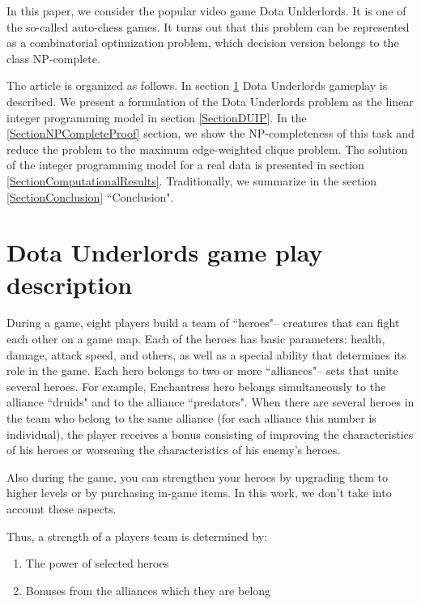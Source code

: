 \documentclass[smallextended]{svjour3}       %
\begin{document}
In this paper, we consider the popular video game Dota Unlderlords. It is one of the so-called auto-chess games. It turns out that this problem can be represented as a combinatorial optimization problem, which decision version  belongs to the class NP-complete.

The article is organized as follows. In section \ref{SectionDUDescription} Dota Underlords gameplay is described.
We present a formulation of the Dota Underlords problem as the linear integer programming model in section \ref{SectionDUIP}. In the \ref{SectionNPCompleteProof} section, we show the NP-completeness of this task and reduce the problem to the maximum edge-weighted clique problem. The solution of the integer programming model for a real data is presented in section \ref{SectionComputationalResults}. Traditionally, we summarize in the section \ref{SectionConclusion} ``Conclusion".

\section{Dota Underlords game play description}
\label{SectionDUDescription}

During a game, eight players build a team of ``heroes"-- creatures that can fight each other on a game map. Each of the heroes has basic parameters: health, damage, attack speed, and others, as well as a special ability that determines its role in the game. Each hero belongs to two or more ``alliances"-- sets that unite several heroes. For example, Enchantress hero belongs simultaneously to the alliance ``druids" and to the alliance ``predators". When there are several heroes in the team who belong to the same alliance (for each alliance this number is individual), the player receives a bonus consisting of improving the characteristics of his heroes or worsening the characteristics of his enemy's heroes.

Also during the game, you can strengthen your heroes by upgrading them to higher levels or by purchasing in-game items. In this work, we don't take into account these aspects.

Thus, a strength of a players team is determined by:

\begin{enumerate}
    \item The power of selected heroes
    \item Bonuses from the alliances which they are belong
\end{enumerate}
\end{document}
